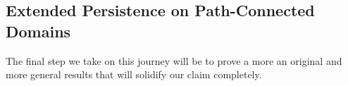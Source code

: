 














\subsection{Extended Persistence on Path-Connected Domains}

The final step we take on this journey will be to prove a more an original and more general results that will solidify our claim completely.


